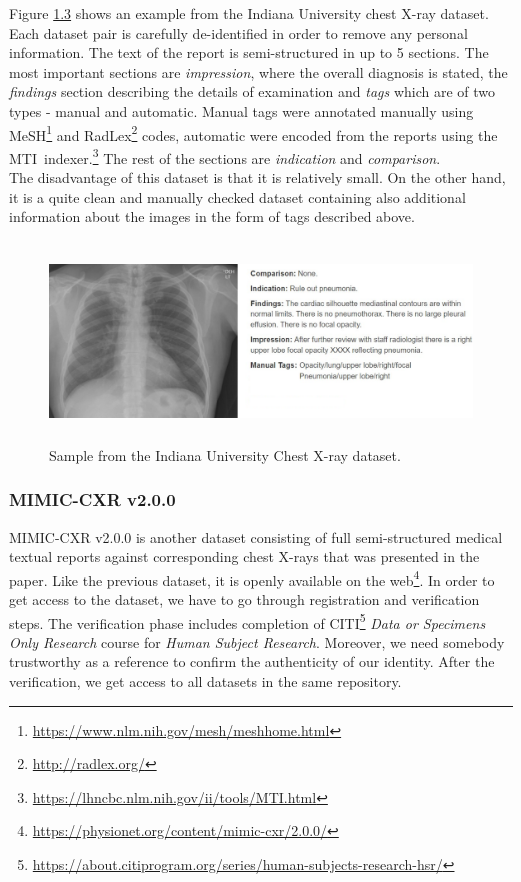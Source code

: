 Figure \hyperref[fig03:IUChestXRaySample]{1.3} shows an example from the Indiana University chest X-ray dataset. Each dataset pair is carefully de-identified in order to remove any personal information. The text of the report is semi-structured in up to 5 sections. The most important sections are \textit{impression}, where the overall diagnosis is stated, the \textit{findings} section describing the details of examination and \textit{tags} which are of two types - manual and automatic. Manual tags were annotated manually using MeSH\footnote[4]{\url{https://www.nlm.nih.gov/mesh/meshhome.html}} and RadLex\footnote[5]{\url{http://radlex.org/}} codes, automatic were encoded from the reports using the MTI~indexer.\footnote[6]{\url{https://lhncbc.nlm.nih.gov/ii/tools/MTI.html}} The rest of the sections are \textit{indication} and \textit{comparison}.\\

The disadvantage of this dataset is that it is relatively small. On the other hand, it is a quite clean and manually checked dataset containing also additional information about the images in the form of tags described above.

\begin{figure}[h]\centering
\includegraphics[width=145mm, height=53mm]{../img/IUChestXRaySample_CXR1728_IM-0479-1001}
\caption{Sample from the Indiana University Chest X-ray dataset.}
\label{fig03:IUChestXRaySample}
\end{figure}

\subsubsection{MIMIC-CXR v2.0.0}
MIMIC-CXR v2.0.0 is another dataset consisting of full semi-structured medical textual reports against corresponding chest X-rays that was presented in the \citet{cxr:johnson2019mimic} paper. Like the previous dataset, it is openly available on the web\footnote[7]{\url{https://physionet.org/content/mimic-cxr/2.0.0/}}. In order to get access to the dataset, we have to go through registration and verification steps. The verification phase includes completion of CITI\footnote[8]{\url{https://about.citiprogram.org/series/human-subjects-research-hsr/}} \textit{Data or Specimens Only Research} course for \textit{Human Subject Research}. Moreover, we need somebody trustworthy as a reference to confirm the authenticity of our identity. After the verification, we get access to all datasets in the same repository.\\

